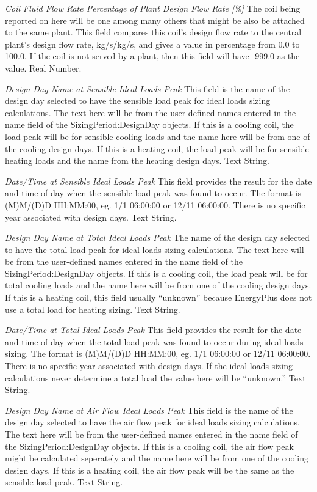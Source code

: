 \emph{Coil Fluid Flow Rate Percentage of Plant Design Flow Rate [\%]}  The coil being reported on here will be one among many others that might be also be attached to the same plant.  This field compares this coil's design flow rate to the central plant's design flow rate, {kg/s}/{kg/s}, and gives a value in percentage from 0.0 to 100.0.  If the coil is not served by a plant, then this field will have -999.0 as the value. Real Number.

\emph{Design Day Name at Sensible Ideal Loads Peak}  This field is the name of the design day selected to have the sensible load peak for ideal loads sizing calculations.  The text here will be from the user-defined names entered in the name field of the SizingPeriod:DesignDay objects.  If this is a cooling coil, the load peak will be for sensible cooling loads and the name here will be from one of the cooling design days.  If this is a heating coil, the load peak will be for sensible heating loads and the name from the heating design days.  Text String.

\emph{Date/Time at Sensible Ideal Loads Peak}  This field provides the result for the date and time of day when the sensible load peak was found to occur.  The format is (M)M/(D)D HH:MM:00, eg. 1/1 06:00:00 or 12/11 06:00:00.  There is no specific year associated with design days. Text String.

\emph{Design Day Name at Total Ideal Loads Peak}  The name of the design day selected to have the total load peak for ideal loads sizing calculations.  The text here will be from the user-defined names entered in the name field of the SizingPeriod:DesignDay objects.  If this is a cooling coil, the load peak will be for total cooling loads and the name here will be from one of the cooling design days.  If this is a heating coil, this field usually ``unknown'' because EnergyPlus does not use a total load for heating sizing. Text String.

\emph{Date/Time at Total Ideal Loads Peak}  This field provides the result for the date and time of day when the total load peak was found to occur during ideal loads sizing.  The format is (M)M/(D)D HH:MM:00, eg. 1/1 06:00:00 or 12/11 06:00:00.  There is no specific year associated with design days.  If the ideal loads sizing calculations never determine a total load the value here will be ``unknown.''  Text String.

\emph{Design Day Name at Air Flow Ideal Loads Peak}  This field is the name of the design day selected to have the air flow peak for ideal loads sizing calculations.  The text here will be from the user-defined names entered in the name field of the SizingPeriod:DesignDay objects.  If this is a cooling coil, the air flow peak might be calculated seperately and the name here will be from one of the cooling design days.  If this is a heating coil, the air flow peak will be the same as the sensible load peak.  Text String.

